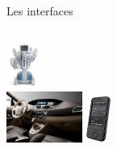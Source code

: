 \begin{frame}{Les interfaces}
\begin{columns}
\begin{column}[T]{5cm}
      \includegraphics[height = 1.5cm]{img/s01/Davinci-Robot-chirurgical-001.jpg}\\
      \includegraphics[width =
      2.5cm]{img/s01/scenic_console_centrale.png}\hspace{1cm}
      \includegraphics[height = 1.5cm]{img/s01/telephone_tc_linux.png}
    \end{column}
  \end{columns}
\end{frame}

